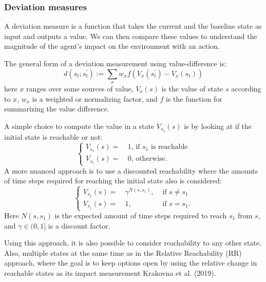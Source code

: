 \documentclass[12pt,A4]{report}
\theoremstyle{definition}
\begin{document}

\subsubsection{Deviation measures}
A deviation measure is a function that takes the current and the baseline state as input and outputs a value. We can then compare these values to understand the magnitude of the agent's impact on the environment with an action.

The general form of a deviation measurement using value-difference is:
  \[d(s_t;s^{\prime}_t) := \sum_x w_x f(V_x(s^{\prime}_t) - V_x(s_t))\]
here $x$ ranges over some sources of value, $V_x(s)$ is the value of state $s$ according to $x$, $w_x$ is a weighted or normalizing factor, and $f$ is the function for summarizing the value difference.

A simple choice to compute the value in a state $V_{s_1}(s)$ is by looking at if the initial state is reachable or not:
\begin{equation*}
  \left\{ 
  \begin{aligned}
    V_{s_1}(s)  =\ & 1 \text{, if } s_1 \text{ is reachable} \\
    V_{s_1}(s)  =\ & 0 \text{, otherwise}.
  \end{aligned}
  \right.
\end{equation*}
A more nuanced approach is to use a discounted reachability where the amounts of time steps required for reaching the initial state also is considered:
\begin{equation*}
  \left\{ 
  \begin{aligned}
    V_{s_1}(s)  =\ & \gamma^ {N(s, s_1)}, &\text{ if } s \neq s_1 \\
    V_{s_1}(s)  =\ & 1 ,&\text{ if } s = s_1.
  \end{aligned}
  \right.
\end{equation*}
Here $N(s, s_1)$ is the expected amount of time steps required to reach $s_1$ from $s$, and $\gamma \in (0, 1]$ is a discount factor.

Using this approach, it is also possible to consider reachability to any other state. Also, multiple states at the same time as in the Relative Reachability (RR) approach, where the goal is to keep options open by using the relative change in reachable states as its impact measurement Krakovna et al. (2019). 
\end{document}
